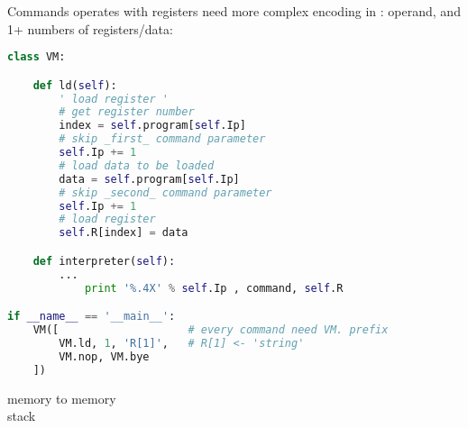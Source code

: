 Commands operates with registers need more complex encoding in : operand, and 1+ numbers of registers/data:

\begin{lstlisting}[language=Python]
class VM:

    def ld(self):
        ' load register '
        # get register number
        index = self.program[self.Ip]
        # skip _first_ command parameter
        self.Ip += 1				 
        # load data to be loaded
        data = self.program[self.Ip] 
        # skip _second_ command parameter
        self.Ip += 1                 
        # load register
        self.R[index] = data         

    def interpreter(self):
    	...
            print '%.4X' % self.Ip , command, self.R

if __name__ == '__main__':
    VM([                    # every command need VM. prefix
        VM.ld, 1, 'R[1]',   # R[1] <- 'string'
        VM.nop, VM.bye
    ])
\end{lstlisting}


\begin{description}
\item[memory to memory]
\item[stack]
\end{description}
